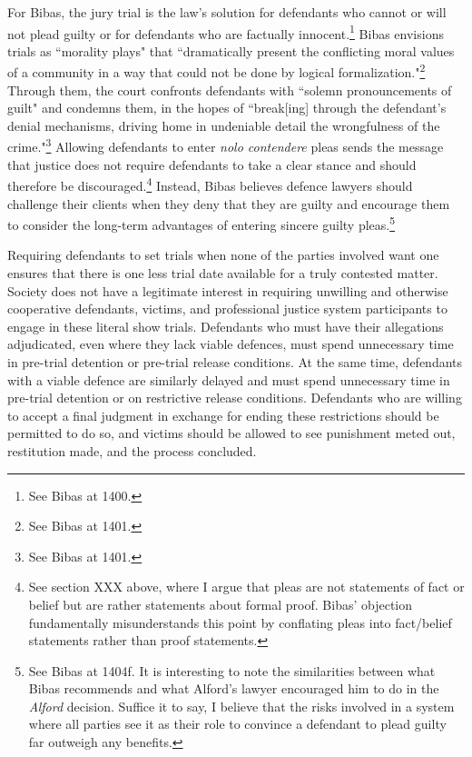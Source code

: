 For Bibas, the jury trial is the law's solution for defendants who cannot or will not plead guilty or for defendants who are factually innocent.\footnote{See Bibas at 1400.} Bibas envisions trials as ``morality plays" that ``dramatically present the conflicting moral values of a community in a way that could not be done by logical formalization."\footnote{See Bibas at 1401.} Through them, the court confronts defendants with ``solemn pronouncements of guilt" and condemns them, in the hopes of ``break[ing] through the defendant's denial mechanisms, driving home in undeniable detail the wrongfulness of the crime."\footnote{See Bibas at 1401.} Allowing defendants to enter \textit{nolo contendere} pleas sends the message that justice does not require defendants to take a clear stance and should therefore be discouraged.\footnote{See section XXX above, where I argue that pleas are not statements of fact or belief but are rather statements about formal proof. Bibas' objection fundamentally misunderstands this point by conflating pleas into fact/belief statements rather than proof statements.} Instead, Bibas believes defence lawyers should challenge their clients when they deny that they are guilty and encourage them to consider the long-term advantages of entering sincere guilty pleas.\footnote{See Bibas at 1404f. It is interesting to note the similarities between what Bibas recommends and what Alford's lawyer encouraged him to do in the \textit{Alford} decision. Suffice it to say, I believe that the risks involved in a system where all parties see it as their role to convince a defendant to plead guilty far outweigh any benefits.}

Requiring defendants to set trials when none of the parties involved want one ensures that there is one less trial date available for a truly contested matter. Society does not have a legitimate interest in requiring unwilling and otherwise cooperative defendants, victims, and professional justice system participants to engage in these literal show trials. Defendants who must have their allegations adjudicated, even where they lack viable defences, must spend unnecessary time in pre-trial detention or pre-trial release conditions. At the same time, defendants with a viable defence are similarly delayed and must spend unnecessary time in pre-trial detention or on restrictive release conditions. Defendants who are willing to accept a final judgment in exchange for ending these restrictions should be permitted to do so, and victims should be allowed to see punishment meted out, restitution made, and the process concluded. 
